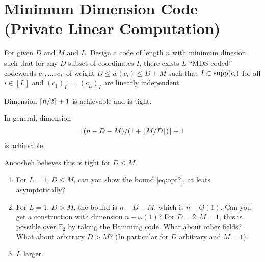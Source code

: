 \section{Minimum Dimension Code (Private Linear Computation)}

\begin{question}
  For given $D$ and $M$ and $L$.
  Design a code of length $n$ with minimum dinesion such that for any $D$-subset of coordinates $I$, there exists $L$ ``MDS-coded'' codewords $c_1,\dots,c_L$ of weight $D\le w(c_i)\le D+M$  such that $I\subset \operatorname*{supp}(c_i)$ for all $i\in[L]$ and $(c_1)_I,\dots,(c_L)_I$ are linearly independent.
\end{question}

\begin{theorem}
  Dimension $\lceil {n/2}\rceil+1$  is achievable and is tight.

  In general, dimension 
  \begin{align}
  \lceil {(n-D-M)/(1+\lceil {M/D}\rceil)}\rceil+1 
  \label{eq:opt?}
  \end{align}
  is achievable. 
  
  Anoosheh believes this is tight for $D\le M$.
  \label{}
\end{theorem}

\begin{enumerate}
  \item For $L=1$, $D\le M$, can you show the bound \eqref{eq:opt?}, at leats asymptotically?

  \item For $L=1$, $D>M$, the bound is $n-D-M$, which is $n-O(1)$. Can you get a construction with dimension $n-\omega(1)$? For $D=2,M=1$, this is possible over $\mathbb{F}_2$ by taking the Hamming code.
    What about other fields? What about arbitrary $D>M$? (In particular for $D$ arbitrary and $M=1$).

  \item $L$ larger.
\end{enumerate}

